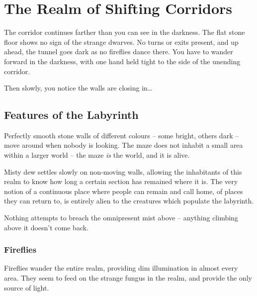 \section{The Realm of Shifting Corridors}\label{shiftingcorridors}

\begin{multicols}{2}

\begin{boxtext}
  The corridor continues farther than you can see in the darkness.
  The flat stone floor shows no sign of the strange dwarves.
  No turns or exits present, and up ahead, the tunnel goes dark as no fireflies dance there.
  You have to wander forward in the darkness, with one hand held tight to the side of the unending corridor.

  Then slowly, you notice the walls are closing in\ldots

\end{boxtext}

\subsection{Features of the Labyrinth}

Perfectly smooth stone walls of different colours -- some bright, others dark -- move around when nobody is looking.
The maze does not inhabit a small area within a larger world -- the maze \emph{is} the world, and it is alive.

Misty dew settles slowly on non-moving walls, allowing the inhabitants of this realm to know how long a certain section has remained where it is.
The very notion of a continuous place where people can remain and call home, of places they can return to, is entirely alien to the creatures which populate the labyrinth.

Nothing attempts to breach the omnipresent mist above -- anything climbing above it doesn't come back.


\encLabyrinth

\subsubsection{Fireflies}

Fireflies wander the entire realm, providing dim illumination in almost every area.
They seem to feed on the strange fungus in the realm, and provide the only source of light.


\end{multicols}
